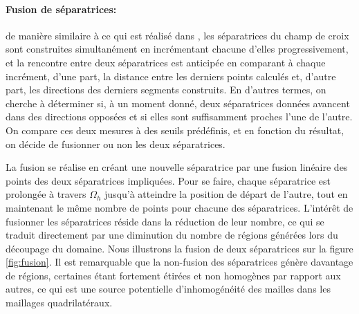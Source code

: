\paragraph{Fusion de séparatrices:}


de manière similaire à ce qui est réalisé dans \cite{marcon2019high}, les séparatrices du champ de croix sont construites simultanément en incrémentant chacune d'elles progressivement, et la rencontre entre deux séparatrices est anticipée en comparant à chaque incrément, d'une part, la distance entre les derniers points calculés et, d'autre part, les directions des derniers segments construits. En d'autres termes, on cherche à déterminer si, à un moment donné, deux séparatrices données avancent dans des directions opposées et si elles sont suffisamment proches l'une de l'autre. On compare ces deux mesures à des seuils prédéfinis, et en fonction du résultat, on décide de fusionner ou non les deux séparatrices.

La fusion se réalise en créant une nouvelle séparatrice par une fusion linéaire des points des deux séparatrices impliquées. Pour se faire, chaque séparatrice est prolongée à travers $\Omega_h$ jusqu'à atteindre la position de départ de l'autre, tout en maintenant le même nombre de points pour chacune des séparatrices. L'intérêt de fusionner les séparatrices réside dans la réduction de leur nombre, ce qui se traduit directement par une diminution du nombre de régions générées lors du découpage du domaine. Nous illustrons la fusion de deux séparatrices sur la figure \ref{fig:fusion}. Il est remarquable que la non-fusion des séparatrices génère davantage de régions, certaines étant fortement étirées et non homogènes par rapport aux autres, ce qui est une source potentielle d'inhomogénéité des mailles dans les maillages quadrilatéraux.


